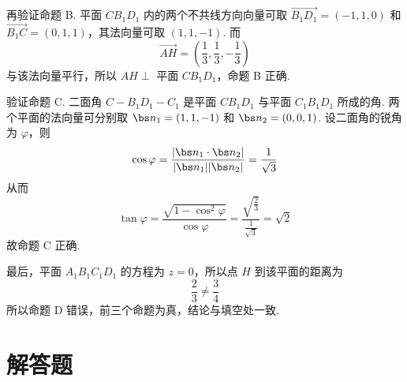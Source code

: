 \begin{problem}
\begin{solution}
再验证命题 B. 平面 \(CB_1D_1\) 内的两个不共线方向向量可取 \(\overrightarrow{B_1D_1}=(-1,1,0)\) 和 \(\overrightarrow{B_1C}=(0,1,1)\)，其法向量可取 \((1,1,-1)\). 而
\[
\overrightarrow{AH}=\left(\frac{1}{3},\frac{1}{3},-\frac{1}{3}\right)
\]
与该法向量平行，所以 \(AH\perp\) 平面 \(CB_1D_1\)，命题 B 正确.

验证命题 C. 二面角 \(C-B_1D_1-C_1\) 是平面 \(CB_1D_1\) 与平面 \(C_1B_1D_1\) 所成的角. 两个平面的法向量可分别取 \(\bs n_1=(1,1,-1)\) 和 \(\bs n_2=(0,0,1)\). 设二面角的锐角为 \(\varphi\)，则
\[
\cos\varphi=\frac{|\bs n_1\cdot\bs n_2|}{|\bs n_1||\bs n_2|}=\frac{1}{\sqrt{3}}
\]
从而
\[
\tan\varphi=\frac{\sqrt{1-\cos^2\varphi}}{\cos\varphi}=\frac{\sqrt{\frac{2}{3}}}{\frac{1}{\sqrt{3}}}=\sqrt{2}
\]
故命题 C 正确.

最后，平面 \(A_1B_1C_1D_1\) 的方程为 \(z=0\)，所以点 \(H\) 到该平面的距离为
\[
\frac{2}{3}\ne\frac{3}{4}
\]
所以命题 D 错误，前三个命题为真，结论与填空处一致.
\end{solution}
\end{problem}

\section{解答题}

